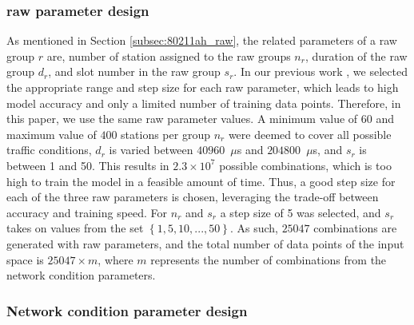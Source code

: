 \subsubsection{\gls{raw} parameter design \label{subsec:raw_para_design}}

As mentioned in Section \ref{subsec:80211ah_raw}, the related parameters of a \gls{raw} group $r$ are, number of station assigned to the \gls{raw} groups $n_r$, duration of the \gls{raw} group $d_r$, and slot number in the \gls{raw} group $s_r$. In our previous work \cite{wowmom2018}, we selected the appropriate range and step size for each \gls{raw} parameter, which leads to high model accuracy and only a limited number of training data points. Therefore, in this paper, we use the same \gls{raw} parameter values. A minimum value of $60$ and maximum value of $400$ stations per group $n_r$ were deemed to cover all possible traffic conditions, $d_r$ is varied between $40960$~$\mu$s and $204800$~$\mu$s, and  $s_r$ is between 1 and 50. This results in $2.3 \times 10^7$ possible combinations, which is too high to train the model in a feasible amount of time. Thus, a good step
size for each of the three \gls{raw} parameters is chosen, leveraging the trade-off between accuracy and training speed.
For $n_r$ and $s_r$ a step size of 5 was selected, and $s_r$ takes on values from the set $\left\{1, 5, 10, ..., 50\right\}$. As such, $25047$ combinations are generated with \gls{raw} parameters, and the total number of data points of the input space is $25047 \times m$, where $m$ represents the number of combinations from the network condition parameters.

\subsubsection{Network condition parameter design \label{subsec:network_para_design}}

